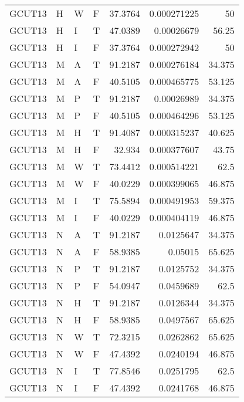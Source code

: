 \begin{table}[htb!]
{\begin{tabular}{llllrrr}
            GCUT13   & H     & W     & F          & 37.3764    & 0.000271225 & 50       \\
            GCUT13   & H     & I     & T          & 47.0389    & 0.00026679  & 56.25    \\
            GCUT13   & H     & I     & F          & 37.3764    & 0.000272942 & 50       \\
            GCUT13   & M     & A     & T          & 91.2187    & 0.000276184 & 34.375   \\
            GCUT13   & M     & A     & F          & 40.5105    & 0.000465775 & 53.125   \\
            GCUT13   & M     & P     & T          & 91.2187    & 0.00026989  & 34.375   \\
            GCUT13   & M     & P     & F          & 40.5105    & 0.000464296 & 53.125   \\
            GCUT13   & M     & H     & T          & 91.4087    & 0.000315237 & 40.625   \\
            GCUT13   & M     & H     & F          & 32.934     & 0.000377607 & 43.75    \\
            GCUT13   & M     & W     & T          & 73.4412    & 0.000514221 & 62.5     \\
            GCUT13   & M     & W     & F          & 40.0229    & 0.000399065 & 46.875   \\
            GCUT13   & M     & I     & T          & 75.5894    & 0.000491953 & 59.375   \\
            GCUT13   & M     & I     & F          & 40.0229    & 0.000404119 & 46.875   \\
            GCUT13   & N     & A     & T          & 91.2187    & 0.0125647   & 34.375   \\
            GCUT13   & N     & A     & F          & 58.9385    & 0.05015     & 65.625   \\
            GCUT13   & N     & P     & T          & 91.2187    & 0.0125752   & 34.375   \\
            GCUT13   & N     & P     & F          & 54.0947    & 0.0459689   & 62.5     \\
            GCUT13   & N     & H     & T          & 91.2187    & 0.0126344   & 34.375   \\
            GCUT13   & N     & H     & F          & 58.9385    & 0.0497567   & 65.625   \\
            GCUT13   & N     & W     & T          & 72.3215    & 0.0262862   & 65.625   \\
            GCUT13   & N     & W     & F          & 47.4392    & 0.0240194   & 46.875   \\
            GCUT13   & N     & I     & T          & 77.8546    & 0.0251795   & 62.5     \\
            GCUT13   & N     & I     & F          & 47.4392    & 0.0241768   & 46.875   \\
            \hline
        \end{tabular}
    }{
    }
\end{table} 
